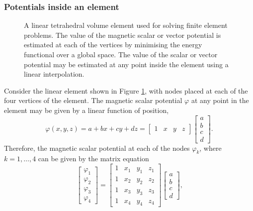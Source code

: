 \subsubsection*{Potentials inside an element}
\begin{figure}
    \centering
    
    \caption{A linear tetrahedral volume element used for solving finite element problems. The value of the magnetic scalar or vector potential is estimated at each of the vertices by minimising the energy functional over a global space. The value of the scalar or vector potential may be estimated at any point inside the element using a linear interpolation.}
    \label{fig:tetElement}
\end{figure}
Consider the linear element shown in Figure \ref{fig:tetElement}, with nodes placed at each of the four vertices of the element. The magnetic scalar potential \(\varphi\) at any point in the element may be given by a linear function of position,
\begin{equation}\label{eqn:femLinEq}
    \varphi\left(x,y,z\right) = a + bx + cy + dz = \begin{bmatrix} 1 & x & y & z \end{bmatrix} \begin{bmatrix} a \\ b \\ c \\ d \end{bmatrix} \text{.}
\end{equation}
Therefore, the magnetic scalar potential at each of the nodes \(\varphi_k\), where \(k = 1,\dots,4\) can be given by the matrix equation
\begin{equation}
    \begin{bmatrix} \varphi_1 \\ \varphi_2 \\ \varphi_3 \\ \varphi_4 \end{bmatrix} = \begin{bmatrix} 1 & x_1 & y_1 & z_1 \\ 1 & x_2 & y_2 & z_2 \\ 1 & x_3 & y_3 & z_3 \\ 1 & x_4 & y_4 & z_4 \end{bmatrix} \begin{bmatrix} a \\ b \\ c \\ d \end{bmatrix} \text{,}
\end{equation}
